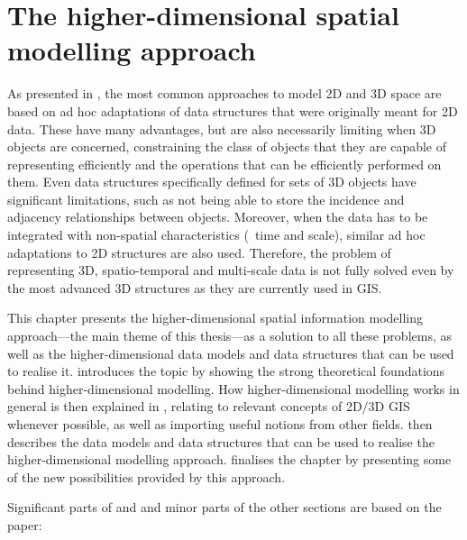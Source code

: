 
\chapter{The higher-dimensional spatial modelling approach}
\label{ch:nd-modelling}

As presented in , the most common approaches to model 2D and 3D space are based on ad hoc adaptations of data structures that were originally meant for 2D data.
These have many advantages, but are also necessarily limiting when 3D objects are concerned, constraining the class of objects that they are capable of representing efficiently and the operations that can be efficiently performed on them.
Even data structures specifically defined for sets of 3D objects have significant limitations, such as not being able to store the incidence and adjacency relationships between objects.
Moreover, when the data has to be integrated with non-spatial characteristics (\eg\ time and scale), similar ad hoc adaptations to 2D structures are also used.
Therefore, the problem of representing 3D, spatio-temporal and multi-scale data is not fully solved even by the most advanced 3D structures as they are currently used in GIS.\@

This chapter presents the higher-dimensional spatial information modelling approach---the main theme of this thesis---as a solution to all these problems, as well as the higher-dimensional data models and data structures that can be used to realise it.
 introduces the topic by showing the strong theoretical foundations behind higher-dimensional modelling.
How higher-dimensional modelling works in general is then explained in , relating to relevant concepts of 2D/3D GIS whenever possible, as well as importing useful notions from other fields.
 then describes the data models and data structures that can be used to realise the higher-dimensional modelling approach.
 finalises the chapter by presenting some of the new possibilities provided by this approach.

Significant parts of  and  and minor parts of the other sections are based on the paper:
\begin{itemize}
\paperijgisndstructures%
\end{itemize}

